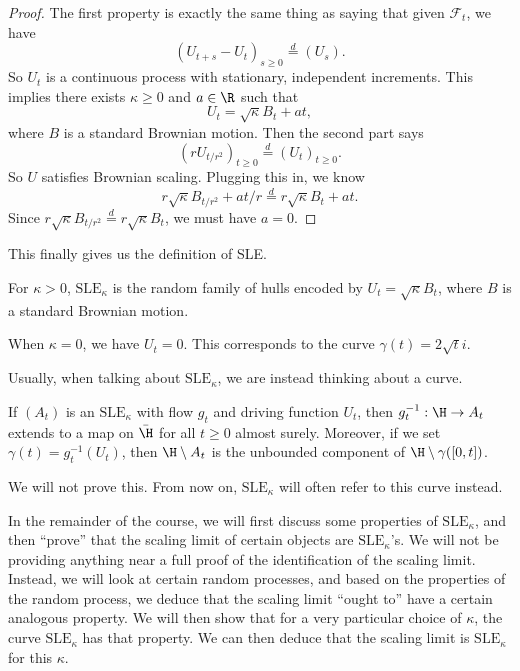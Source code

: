 \documentclass[a4paper]{article}
\newcommand\SLE{\mathrm{SLE}}
\begin{document}
\begin{proof}
  The first property is exactly the same thing as saying that given $\mathcal{F}_t$, we have
  \[
    (U_{t + s} - U_t)_{s \geq 0} \overset{d}{=} (U_s).
  \]
  So $U_t$ is a continuous process with stationary, independent increments. This implies there exists $\kappa \geq 0$ and $a \in \R$ such that
  \[
    U_t = \sqrt{\kappa}B_t + at,
  \]
  where $B$ is a standard Brownian motion. Then the second part says
  \[
    (r U_{t/r^2})_{t \geq 0} \overset{d}{=} (U_t)_{t \geq 0}.
  \]
  So $U$ satisfies Brownian scaling. Plugging this in, we know
  \[
    r \sqrt{\kappa} B_{t/r^2} + at/r \overset{d}{=} r \sqrt{\kappa} B_t + at.
  \]
  Since $r \sqrt{\kappa} B_{t/r^2} \overset{d}{=} r \sqrt{\kappa} B_t$, we must have $a = 0$.
\end{proof}

This finally gives us the definition of SLE.
\begin{defi}
  For $\kappa > 0$, $\SLE_\kappa$ is the random family of hulls encoded by $U_t = \sqrt{\kappa} B_t$, where $B$ is a standard Brownian motion.
\end{defi}
When $\kappa = 0$, we have $U_t = 0$. This corresponds to the curve $\gamma(t) = 2 \sqrt{t} i$.

Usually, when talking about $\SLE_\kappa$, we are instead thinking about a curve.
\begin{thm}
  If $(A_t)$ is an $\SLE_\kappa$ with flow $g_t$ and driving function $U_t$, then $g_t^{-1}: \H \to A_t$ extends to a map on $\bar{\H}$ for all $t \geq 0$ almost surely. Moreover, if we set $\gamma(t) = g_t^{-1}(U_t)$, then $\H \setminus A_t$ is the unbounded component of $\H \setminus \gamma([0, t])$.\fakeqed
\end{thm}
We will not prove this. From now on, $\SLE_\kappa$ will often refer to this curve instead.

In the remainder of the course, we will first discuss some properties of $\SLE_\kappa$, and then ``prove'' that the scaling limit of certain objects are $\SLE_\kappa$'s. We will not be providing anything near a full proof of the identification of the scaling limit. Instead, we will look at certain random processes, and based on the properties of the random process, we deduce that the scaling limit ``ought to'' have a certain analogous property. We will then show that for a very particular choice of $\kappa$, the curve $\SLE_\kappa$ has that property. We can then deduce that the scaling limit is $\SLE_\kappa$ for this $\kappa$.
\end{document}
